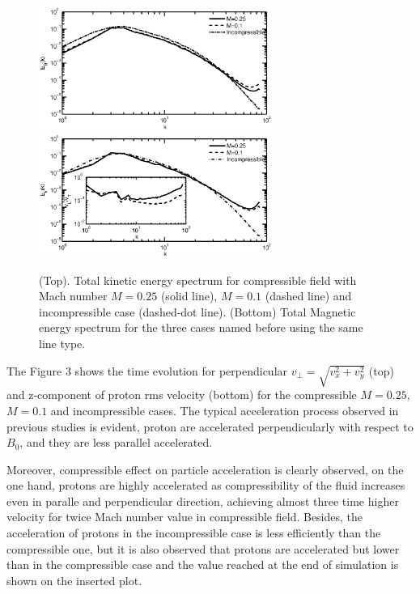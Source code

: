 \documentclass[%
aip,pop,amsmath,amssymb,
 reprint,%
]{revtex4-1}
\begin{document}
\begin{figure}[h!]
\begin{center}
{\includegraphics[width = 3in]{./Figures/Fig2_b}}\\
{\includegraphics[width = 3in]{./Figures/Fig2_a}}
\caption{(Top). Total kinetic energy spectrum for compressible field with Mach 
number $M=0.25$ (solid line), $M=0.1$ (dashed line) and incompressible case (dashed-dot line).
(Bottom) Total Magnetic energy spectrum for the three cases named before using the same line 
type.}
\end{center}
\label{mean square velocity}
\end{figure}

The Figure 3 shows the time evolution for perpendicular $v_\perp=\sqrt{v_x^2+v_y^2}$ 
(top) and z-component of proton rms velocity (bottom) for the compressible $M=0.25$, $M=0.1$
and incompressible cases. The typical acceleration process observed in previous studies is
evident, proton are accelerated perpendicularly with respect to $B_0$, and they are less
parallel accelerated. 

Moreover, compressible effect on particle acceleration is clearly observed, on the one hand, 
protons are highly accelerated as compressibility of the fluid increases even in paralle and 
perpendicular direction, achieving almost three time higher velocity for twice Mach number value in
compressible field. Besides, the acceleration of protons in the incompressible case is less
efficiently than the compressible one, but it is also observed that protons are accelerated
but lower than in the compressible case and the value reached at the end of simulation is
shown on the inserted plot.
\end{document}
